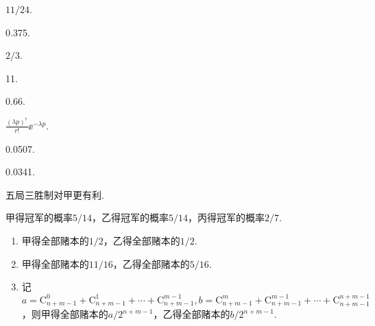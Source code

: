 \begin{answer}
  \item $11/24$.

  \item 0.375.

  \item $2/3$.

  \item 11.

  \item 0.66.

  \item $\frac{(\lambda p)^r}{r!}\ee^{-\lambda p}$.

  \item \begin{enumerate*}
    \item 0.0507.
    \item 0.0341.
  \end{enumerate*}

  \item 五局三胜制对甲更有利.

  \item 甲得冠军的概率$5/14$，乙得冠军的概率$5/14$，丙得冠军的概率$2/7$.

  \item \begin{enumerate}
    \item 甲得全部赌本的$1/2$，乙得全部赌本的$1/2$.
    \item 甲得全部赌本的$11/16$，乙得全部赌本的$5/16$.
    \item 记$a=\mathrm C_{n+m-1}^0+\mathrm C_{n+m-1}^1+\cdots+
    \mathrm C_{n+m-1}^{m-1},b=\mathrm C_{n+m-1}^m+\mathrm C_{n+m-1}^{m-1}+\cdots+\mathrm C_{n+m-1}^{n+m-1}$，则甲得全部赌本的$a/2^{n+m-1}$，乙得全部赌本的$b/2^{n+m-1}$.
  \end{enumerate}
\end{answer}


